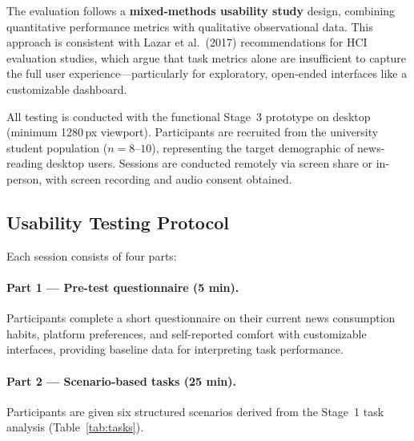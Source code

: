 \documentclass[14pt]{article}
\begin{document}
The evaluation follows a \textbf{mixed-methods usability study} design, combining quantitative performance metrics with qualitative observational data. This approach is consistent with Lazar et al.\ (2017) recommendations for HCI evaluation studies, which argue that task metrics alone are insufficient to capture the full user experience---particularly for exploratory, open-ended interfaces like a customizable dashboard.

All testing is conducted with the functional Stage~3 prototype on desktop (minimum 1280\,px viewport). Participants are recruited from the university student population ($n = 8$--$10$), representing the target demographic of news-reading desktop users. Sessions are conducted remotely via screen share or in-person, with screen recording and audio consent obtained.

\subsection{Usability Testing Protocol}

Each session consists of four parts:

\paragraph{Part 1 --- Pre-test questionnaire (5 min).}
Participants complete a short questionnaire on their current news consumption habits, platform preferences, and self-reported comfort with customizable interfaces, providing baseline data for interpreting task performance.

\paragraph{Part 2 --- Scenario-based tasks (25 min).}
Participants are given six structured scenarios derived from the Stage~1 task analysis (Table~\ref{tab:tasks}).
\end{document}
